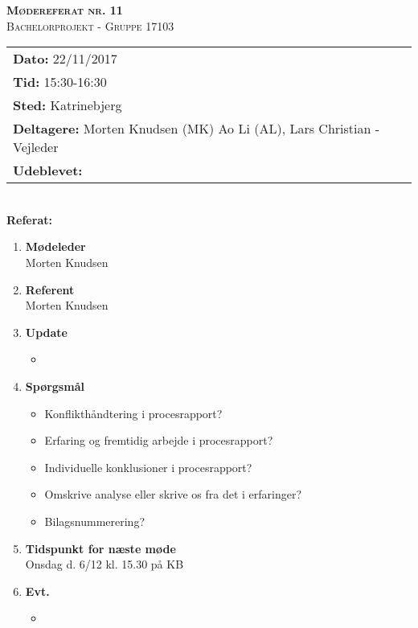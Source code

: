 
\newcommand{\HRule}{\rule{\linewidth}{0.1mm}}


	\begin{center}
		{\huge \bfseries \textsc{Mødereferat nr. 11}}\\
		\textsc{\large Bachelorprojekt - Gruppe 17103}\\[0.3cm]
	\end{center}
	\begin{tabular}{ll}
	\large \textbf{Dato:} 22/11/2017  	\\ %
	\large \textbf{Tid:}  15:30-16:30 	\\ %
	\large \textbf{Sted:} Katrinebjerg		\\ %
	\large \textbf{Deltagere:} Morten Knudsen (MK) Ao Li (AL), Lars Christian - Vejleder \\
	\large \textbf{Udeblevet:} 
	\end{tabular}\\
	\phantom{\,}\hspace{0.1em} \large \textbf{Referat:}
	\begin{enumerate}
		\itemsep 0.3em 
		\item \textbf{Mødeleder}\\
			Morten Knudsen
		\item \textbf{Referent}\\
			Morten Knudsen

		\item \textbf{Update}
			\begin{itemize}[-]
				\item 
				
			\end{itemize}
			
		\item \textbf{Spørgsmål}
			\begin{itemize}[-]
				\item Konflikthåndtering i procesrapport?
				\item Erfaring og fremtidig arbejde i procesrapport?
				\item Individuelle konklusioner i procesrapport?
				\item Omskrive analyse eller skrive os fra det i erfaringer?
				\item Bilagsnummerering?
				
			\end{itemize}
	
		\item \textbf{Tidspunkt for næste møde} \\
			Onsdag d. 6/12 kl. 15.30 på KB
			
		\item \textbf{Evt.}
			\begin{itemize}[-]
				\item 
			\end{itemize}
			
	\end{enumerate}

